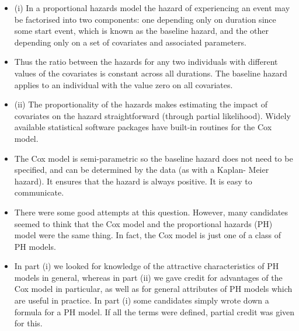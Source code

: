\documentclass[a4paper,12pt]{article}
\begin{document}
\newpage
\begin{itemize}
    \item (i)
In a proportional hazards model the hazard of experiencing an event
may be factorised into two components:
one depending only on duration since some start event, which is known as the
baseline hazard, and the other depending only on a set of covariates and
associated parameters.
\item Thus the ratio between the hazards for any two individuals with different
values of the covariates is constant across all durations.
The baseline hazard applies to an individual with the value zero on all
covariates.
\item (ii)
The proportionality of the hazards makes estimating the impact of
covariates on the hazard straightforward (through partial likelihood).
Widely available statistical software packages have built-in routines for the
Cox model.
\item The Cox model is semi-parametric so the baseline hazard does not
need to be specified, and can be determined by the data (as with a Kaplan-
Meier hazard).
It ensures that the hazard is always positive.
It is easy to communicate.
\item There were some good attempts at this question. However, many candidates seemed to think
that the Cox model and the proportional hazards (PH) model were the same thing. In fact,
the Cox model is just one of a class of PH models. 
\item In part (i) we looked for knowledge of the
attractive characteristics of PH models in general, whereas in part (ii) we gave credit for
advantages of the Cox model in particular, as well as for general attributes of PH models
which are useful in practice. In part (i) some candidates simply wrote down a formula for a
PH model. If all the terms were defined, partial credit was given for this.
\end{itemize}
\end{document}

